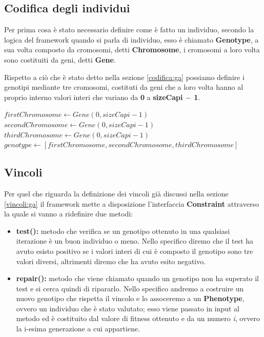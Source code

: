 \documentclass[a4paper, 11pt, oneside]{report}
\begin{document}
                \subsection{Codifica degli individui}
                \par \noindent Per prima cosa è stato necessario definire come è fatto un individuo, secondo la logica
                del framework quando si parla di individuo, esso è chiamato \textbf{Genotype}, a sua volta composto
                da cromosomi, detti \textbf{Chromosome}, i cromosomi a loro volta sono costituiti da geni, detti
                \textbf{Gene}.
                \medskip
                \par \noindent Rispetto a ciò che è stato detto nella sezione \ref{codifica:ga} possiamo definire
                i genotipi mediante tre cromosomi, costituti da geni che a loro volta hanno al proprio interno valori
                interi che variano da \textbf{0} a \textbf{sizeCapi $-$ 1}.
                \medskip
                \begin{algorithmic}[1]
                    \State $firstChromosome \gets Gene(0,sizeCapi-1)$
                    \State $secondChromosome \gets Gene(0,sizeCapi-1)$
                    \State $thirdChromosome \gets Gene(0,sizeCapi-1)$
                    \State $genotype \gets [firstChromosome, secondChromosome, thirdChromosome]$
                \end{algorithmic}

                \subsection{Vincoli}
                \par \noindent Per quel che riguarda la definizione dei vincoli già discussi nella sezione \ref{vincoli:ga}
                il framework mette a disposizione l'interfaccia \textbf{Constraint} attraverso la quale si vanno a ridefinire
                due metodi:
                \begin{itemize}
                    \item \textbf{test():} metodo che verifica se un genotipo ottenuto in una qualsiasi iterazione è un
                    buon individuo o meno.
                    Nello specifico diremo che il test ha avuto esisto positivo se i valori interi di cui è composto il
                    genotipo sono tre valori diversi, altrimenti diremo che ha avuto esito negativo.
                    \item \textbf{repair():} metodo che viene chiamato quando un genotipo non ha superato il test e si
                    cerca quindi di ripararlo.
                    Nello specifico andremo a costruire un nuovo genotipo che rispetta il vincolo e lo assoceremo a un
                    \textbf{Phenotype}, ovvero un individuo che è stato valutato; esso viene passato in input al metodo
                    ed è costituito dal valore di fitness ottenuto e da un numero \emph{i}, ovvero la i-esima generazione
                    a cui appartiene.
                \end{itemize}
\end{document}
